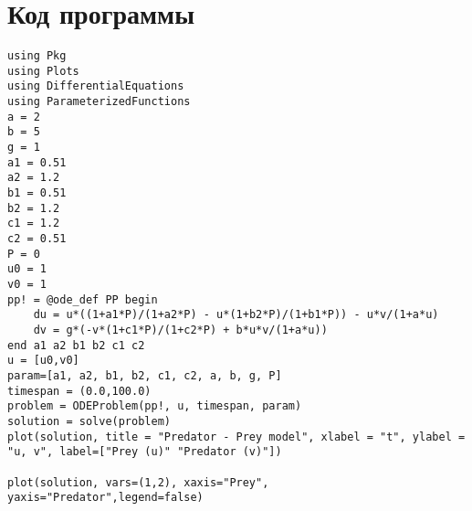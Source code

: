 \appendix

\hypertarget{ux43aux43eux434-ux43fux440ux43eux433ux440ux430ux43cux43cux44b}{%
\chapter{Код
программы}\label{ux43aux43eux434-ux43fux440ux43eux433ux440ux430ux43cux43cux44b}}

\begin{verbatim}
using Pkg
using Plots
using DifferentialEquations
using ParameterizedFunctions
a = 2
b = 5
g = 1
a1 = 0.51
a2 = 1.2
b1 = 0.51
b2 = 1.2
c1 = 1.2
c2 = 0.51
P = 0
u0 = 1
v0 = 1
pp! = @ode_def PP begin
    du = u*((1+a1*P)/(1+a2*P) - u*(1+b2*P)/(1+b1*P)) - u*v/(1+a*u)
    dv = g*(-v*(1+c1*P)/(1+c2*P) + b*u*v/(1+a*u))
end a1 a2 b1 b2 c1 c2 
u = [u0,v0]
param=[a1, a2, b1, b2, c1, c2, a, b, g, P]
timespan = (0.0,100.0)
problem = ODEProblem(pp!, u, timespan, param)
solution = solve(problem)
plot(solution, title = "Predator - Prey model", xlabel = "t", ylabel = "u, v", label=["Prey (u)" "Predator (v)"])

plot(solution, vars=(1,2), xaxis="Prey", yaxis="Predator",legend=false)
\end{verbatim}
